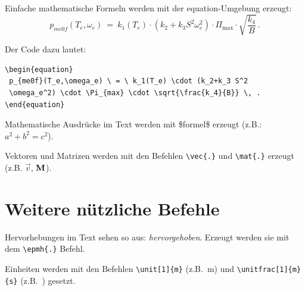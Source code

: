 Einfache mathematische Formeln werden mit der equation-Umgebung
erzeugt:
\begin{equation}
 p_{me0f}(T_e,\omega_e) \ = \ k_1(T_e) \cdot (k_2+k_3 S^2
 \omega_e^2) \cdot \Pi_{\mathrm{max}} \cdot \sqrt{\frac{k_4}{B}} \, .
 	\label{eq:my_equation}
\end{equation}

Der Code dazu lautet:
\begin{verbatim}
\begin{equation}
 p_{me0f}(T_e,\omega_e) \ = \ k_1(T_e) \cdot (k_2+k_3 S^2
 \omega_e^2) \cdot \Pi_{max} \cdot \sqrt{\frac{k_4}{B}} \, .
\end{equation}
\end{verbatim}

Mathematische Ausdrücke im Text werden mit \$formel\$ erzeugt (z.B.:
$a^2+b^2=c^2$).

Vektoren und Matrizen werden mit den Befehlen \texttt{\textbackslash vec\{.\}} und \texttt{\textbackslash mat\{.\}} erzeugt (z.B. $\vec{v}$, $\mat{M}$).


\section{Weitere nützliche Befehle}\label{sec:div}

Hervorhebungen im Text sehen so aus: \emph{hervorgehoben}. Erzeugt
werden sie mit dem \texttt{\textbackslash epmh\{.\}} Befehl.

Einheiten werden mit den Befehlen \texttt{\textbackslash unit[1]\{m\}} (z.B.~\unit[1]{m}) und \texttt{\textbackslash unitfrac[1]\{m\}\{s\}} (z.B.~) gesetzt.
